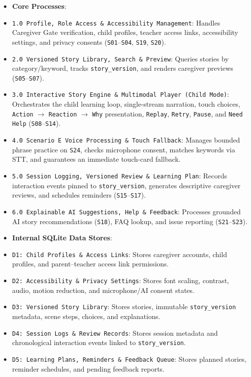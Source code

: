 \begin{itemize}
  \item \textbf{Core Processes}:
  \item \texttt{1.0 Profile, Role Access \& Accessibility Management}: Handles Caregiver Gate verification, child profiles, teacher access links, accessibility settings, and privacy consents (\texttt{S01}–\texttt{S04}, \texttt{S19}, \texttt{S20}).
  \item \texttt{2.0 Versioned Story Library, Search \& Preview}: Queries stories by category/keyword, tracks \texttt{story\_version}, and renders caregiver previews (\texttt{S05}–\texttt{S07}).
  \item \texttt{3.0 Interactive Story Engine \& Multimodal Player (Child Mode)}: Orchestrates the child learning loop, single-stream narration, touch choices, \texttt{Action} $\rightarrow$ \texttt{Reaction} $\rightarrow$ \texttt{Why} presentation, \texttt{Replay}, \texttt{Retry}, \texttt{Pause}, and \texttt{Need Help} (\texttt{S08}–\texttt{S14}).
  \item \texttt{4.0 Scenario E Voice Processing \& Touch Fallback}: Manages bounded phrase practice on \texttt{S24}, checks microphone consent, matches keywords via STT, and guarantees an immediate touch-card fallback.
  \item \texttt{5.0 Session Logging, Versioned Review \& Learning Plan}: Records interaction events pinned to \texttt{story\_version}, generates descriptive caregiver reviews, and schedules reminders (\texttt{S15}–\texttt{S17}).
  \item \texttt{6.0 Explainable AI Suggestions, Help \& Feedback}: Processes grounded AI story recommendations (\texttt{S18}), FAQ lookup, and issue reporting (\texttt{S21}–\texttt{S23}).
  \item \textbf{Internal SQLite Data Stores}:
  \item \texttt{D1: Child Profiles \& Access Links}: Stores caregiver accounts, child profiles, and parent–teacher access link permissions.
  \item \texttt{D2: Accessibility \& Privacy Settings}: Stores font scaling, contrast, audio, motion reduction, and microphone/AI consent states.
  \item \texttt{D3: Versioned Story Library}: Stores stories, immutable \texttt{story\_version} metadata, scene steps, choices, and explanations.
  \item \texttt{D4: Session Logs \& Review Records}: Stores session metadata and chronological interaction events linked to \texttt{story\_version}.
  \item \texttt{D5: Learning Plans, Reminders \& Feedback Queue}: Stores planned stories, reminder schedules, and pending feedback reports.
\end{itemize}



